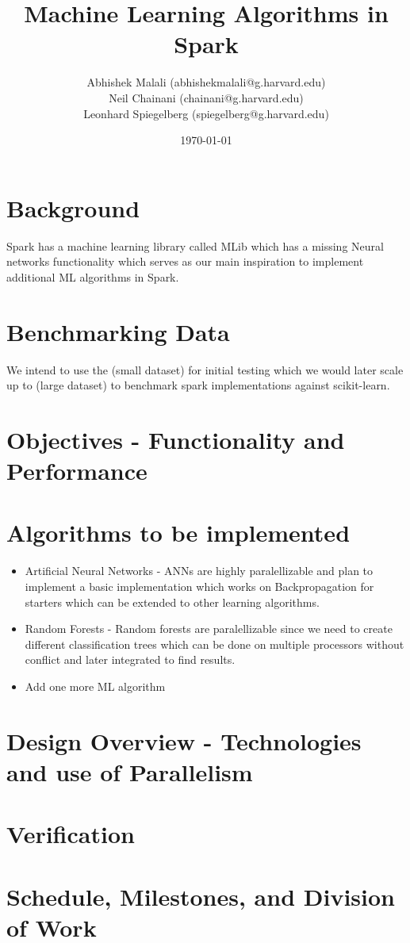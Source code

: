 \documentclass{article}
\begin{document}
	\title{Machine Learning Algorithms in Spark}
	\author{Abhishek Malali (abhishekmalali@g.harvard.edu)\\
			Neil Chainani (chainani@g.harvard.edu)\\
			Leonhard Spiegelberg (spiegelberg@g.harvard.edu)}
	\date{\today}
	\maketitle
	\section{Background}
	Spark has a machine learning library called MLib which has a missing Neural networks functionality which serves as our main inspiration to implement additional ML algorithms in Spark.

	\section{Benchmarking Data}
	We intend to use the (small dataset) for initial testing which we would later scale up to (large dataset) to benchmark spark implementations against scikit-learn. 


	\section{Objectives - Functionality and Performance}

	\section{Algorithms to be implemented}
		\begin{itemize}
			\item Artificial Neural Networks - ANNs are highly paralellizable and plan to implement a basic implementation which works on Backpropagation for starters which can be extended to other learning algorithms.
			\item Random Forests - Random forests are paralellizable since we need to create different classification trees which can be done on multiple processors without conflict and later integrated to find results.
			\item Add one more ML algorithm
		\end{itemize}

	\section{Design Overview - Technologies and use of Parallelism}

	\section{Verification}

	\section{Schedule, Milestones, and Division of Work}
\end{document}
